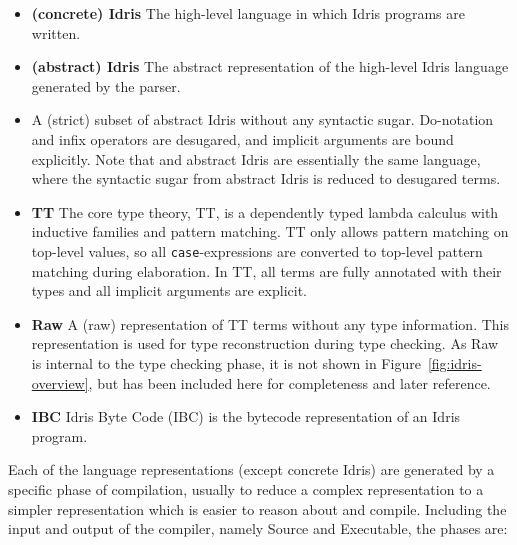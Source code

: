 \begin{itemize}
\item \textbf{(concrete) Idris}
The high-level language in which Idris programs are written.
\item \textbf{(abstract) Idris}
The abstract representation of the high-level Idris language generated by the parser.
\item \textbf{\IdrisM}
A (strict) subset of abstract Idris without any syntactic sugar. Do-notation and infix operators
are desugared, and implicit arguments are bound explicitly. Note that
\IdrisM{} and abstract Idris are essentially the same language, where the
syntactic sugar from abstract Idris is reduced to desugared terms.
\item \textbf{TT}
The core type theory, TT, is a dependently typed lambda calculus with inductive
families and pattern matching. TT only allows pattern matching on top-level values,
so all \texttt{case}-expressions are converted to top-level pattern matching
during elaboration. In TT, all terms are fully annotated with their types and
all implicit arguments are explicit.
\item \textbf{Raw}
A (raw) representation of TT terms without any type information. This
representation is used for type reconstruction during type checking. As Raw is
internal to the type checking phase, it is not shown in
Figure~\ref{fig:idris-overview}, but has been included here for completeness and
later reference.
\item \textbf{IBC}
Idris Byte Code (IBC) is the bytecode representation of an Idris program.
\end{itemize}

Each of the language representations (except concrete Idris) are generated by a specific phase of
compilation, usually to reduce a complex representation to a simpler
representation which is easier to reason about and compile. Including the input
and output of the compiler, namely Source and Executable, the phases are:

